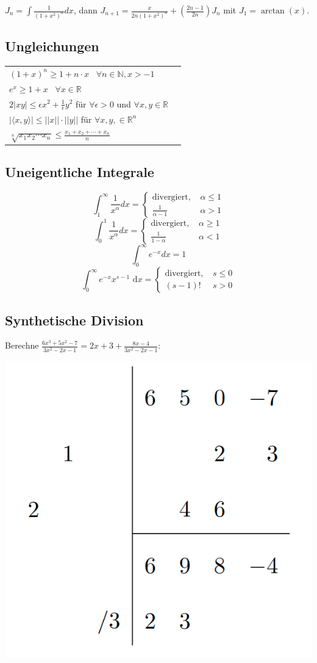 \documentclass[a4paper,10pt]{article}
\def\dx{\text{ d}x}
\begin{document}
$J_n = \int \frac{1}{(1 + x^2)^n} dx$, dann $J_{n+1} = \frac{x}{2n(1 + x^2)^n} + (\frac{2n - 1}{2n})J_n$ mit $J_1 = \arctan(x)$.

\subsection{Ungleichungen}
\begin{center}
  \begin{tabularx}{\linewidth}{>{\centering\arraybackslash}X>{\centering\arraybackslash}X}
    $(1+x)^n \geq 1+ n\cdot x$ \, $\forall n\in \mathbb{N}, x > -1$\\
    $e^x \geq 1 + x$ \, $\forall x\in \mathbb{R}$\\
    $2|xy| \leq \epsilon x^2 + \frac{1}{\epsilon} y^2$ für $\forall \epsilon > 0$ und $\forall x,y \in \mathbb{R}$\\
    $|\langle x,y \rangle| \leq ||x|| \cdot ||y||$ für $\forall x,y, \in \mathbb{R}^n$\\
    $\sqrt[n]{x_1 x_2 \cdots x_n} \leq \frac{x_1 + x_2 + \cdots + x_n}{n}$
  \end{tabularx}
\end{center}

\subsection{Uneigentliche Integrale}
$$\int_1^\infty \frac{1}{x^\alpha} dx = \begin{cases}
  \text{divergiert, } & \alpha \leq 1\\
  \frac{1}{\alpha - 1} & \alpha > 1
\end{cases}$$
$$\int_0^1 \frac{1}{x^\alpha} dx = \begin{cases}
  \text{divergiert, } & \alpha \geq 1\\
  \frac{1}{1- \alpha} & \alpha < 1
\end{cases}$$
$$\int_0^\infty e^{-x}dx = 1$$
$$\int_0^\infty e^{-x}x^{s-1}\dx = \begin{cases}
  \text{divergiert, } & s \leq 0\\
  (s-1)! & s > 0
\end{cases}$$

\subsection{Synthetische Division}
Berechne $\frac{6x^3 + 5x^2 - 7}{3x^2 - 2x - 1} = 2x + 3 + \frac{8x - 4}{3x^2 -2x - 1}$:\\
\begin{center}
  \includegraphics[width=0.4 \linewidth]{synthetic-division.png}
\end{center}
\end{document}
